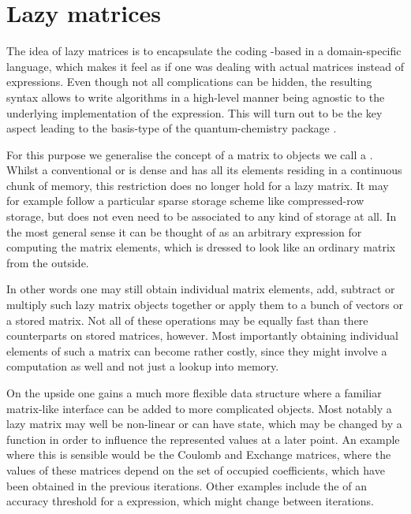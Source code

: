 \section{Lazy matrices}
\label{sec:lazymat}
The idea of lazy matrices is to encapsulate the coding \contraction-based
in a domain-specific language,
which makes it feel as if one was dealing with actual matrices
instead of \contraction expressions.
Even though not all complications can be hidden,
the resulting syntax allows to write algorithms in a high-level manner
being agnostic to the underlying implementation of the \contraction expression.
This will turn out to be the key aspect
leading to the basis-type of the quantum-chemistry package \molsturm.

For this purpose we generalise the concept of a matrix
to objects we call a .
Whilst a conventional or  is dense
and has all its elements residing in a continuous chunk of memory,
this restriction does no longer hold for a lazy matrix.
It may for example follow a particular sparse storage scheme
like compressed-row storage,
but does not even need to be associated to any kind of storage at all.
In the most general sense it can be thought of as an
arbitrary \contraction expression for computing the matrix elements,
which is dressed to look like an ordinary matrix from the outside.

In other words one may still obtain individual matrix elements,
add, subtract or multiply such lazy matrix objects together
or apply them to a bunch of vectors or a stored matrix.
Not all of these operations may be equally fast
than there counterparts on stored matrices, however.
Most importantly obtaining individual elements of such a matrix
can become rather costly,
since they might involve a computation as well
and not just a lookup into memory.

On the upside one gains a much more flexible data structure
where a familiar matrix-like interface
can be added to more complicated objects.
Most notably a lazy matrix may well be non-linear or can have state,
which may be changed by a \update function
in order to influence the represented values at a later point.
An example where this is sensible would be the Coulomb and Exchange matrices,
where the values of these matrices depend on the set of occupied coefficients,
which have been obtained in the previous iterations.
Other examples include the \update of an accuracy threshold for a \contraction expression,
which might change between iterations.

